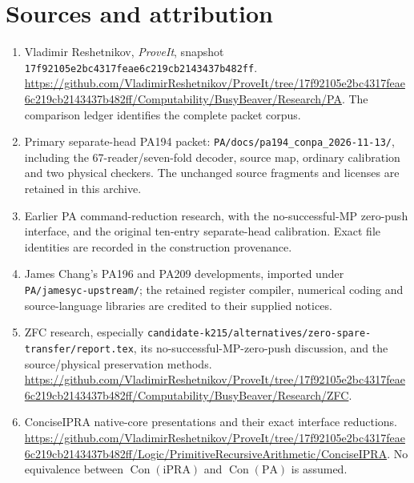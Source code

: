 \documentclass[11pt,letterpaper]{article}
\newcommand{\PA}{\mathrm{PA}}
\newcommand{\Con}{\operatorname{Con}}
\newcommand{\file}[1]{\texttt{\nolinkurl{#1}}}
\begin{document}
\section*{Sources and attribution}
\begin{enumerate}[leftmargin=*]
\item Vladimir Reshetnikov, \emph{ProveIt}, snapshot
\nolinkurl{17f92105e2bc4317feae6c219cb2143437b482ff}.
\url{https://github.com/VladimirReshetnikov/ProveIt/tree/17f92105e2bc4317feae6c219cb2143437b482ff/Computability/BusyBeaver/Research/PA}.
The comparison ledger identifies the complete packet corpus.
\item Primary separate-head PA194 packet:
\file{PA/docs/pa194_conpa_2026-11-13/}, including the 67-reader/seven-fold
decoder, source map, ordinary calibration and two physical checkers.
The unchanged source fragments and licenses are retained in this archive.
\item Earlier PA command-reduction research, with the no-successful-MP
zero-push interface, and the original ten-entry separate-head calibration.
Exact file identities are recorded in the construction provenance.
\item James Chang's PA196 and PA209 developments, imported under
\file{PA/jamesyc-upstream/}; the retained register compiler, numerical
coding and source-language libraries are credited to their supplied notices.
\item ZFC research, especially
\file{candidate-k215/alternatives/zero-spare-transfer/report.tex}, its
no-successful-MP-zero-push discussion, and the source/physical preservation
methods. \url{https://github.com/VladimirReshetnikov/ProveIt/tree/17f92105e2bc4317feae6c219cb2143437b482ff/Computability/BusyBeaver/Research/ZFC}.
\item ConciseIPRA native-core presentations and their exact interface
reductions. \url{https://github.com/VladimirReshetnikov/ProveIt/tree/17f92105e2bc4317feae6c219cb2143437b482ff/Logic/PrimitiveRecursiveArithmetic/ConciseIPRA}.
No equivalence between $\Con(\mathrm{iPRA})$ and $\Con(\PA)$ is assumed.
\end{enumerate}
\end{document}
